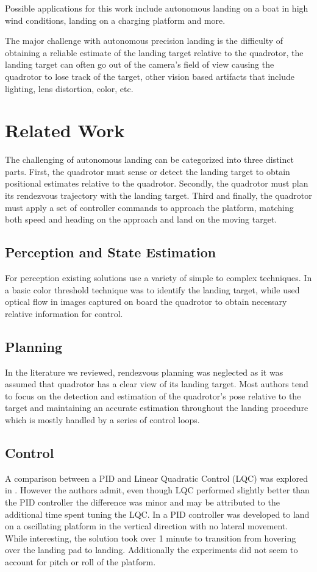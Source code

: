\documentclass[11pt, twocolumn]{article}
\begin{document}
Possible applications for this work include autonomous landing on a boat in high wind conditions, landing on a charging platform and more.

The major challenge with autonomous precision landing is the difficulty of obtaining a reliable estimate of the landing target relative to the quadrotor, the landing target can often go out of the camera's field of view causing the quadrotor to lose track of the target, other vision based artifacts that include lighting, lens distortion, color, etc.


\section{Related Work}
The challenging of autonomous landing can be categorized into three distinct parts. First, the quadrotor must sense or detect the landing target to obtain positional estimates relative to the quadrotor. Secondly, the quadrotor must plan its rendezvous trajectory with the landing target. Third and finally, the quadrotor must apply a set of controller commands to approach the platform, matching both speed and heading on the approach and land on the moving target. 

\subsection{Perception and State Estimation}
For perception existing solutions use a variety of simple to complex techniques. In \cite{Kim2014} a basic color threshold technique was to identify the landing target, while \cite{Herisse2012} used optical flow in images captured on board the quadrotor to obtain necessary relative information for control. 

\subsection{Planning}
In the literature we reviewed, rendezvous planning was neglected as it was assumed that quadrotor has a clear view of its landing target. Most authors tend to focus on the detection and estimation of the quadrotor's pose relative to the target and maintaining an accurate estimation throughout the landing procedure which is mostly handled by a series of control loops.

\subsection{Control}
A comparison between a PID and Linear Quadratic Control (LQC) was explored in \cite{Friis2009}. However the authors admit, even though LQC performed slightly better than the PID controller the difference was minor and may be attributed to the additional time spent tuning the LQC. In \cite{Herisse2012} a PID controller was developed to land on a oscillating platform in the vertical direction with no lateral movement. While interesting, the solution took over 1 minute to transition from hovering over the landing pad to landing. Additionally the experiments did not seem to account for pitch or roll of the platform.  
\end{document}
